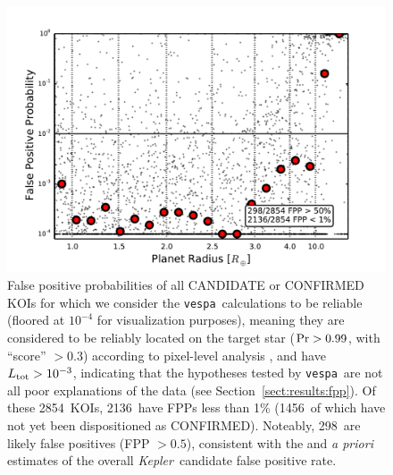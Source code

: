\documentclass{emulateapj}
\newcommand{\figlabel}[1]{\label{fig:#1}}
\newcommand{\sectionname}{Section}
\newcommand{\Sect}[1]{\sectionname~\ref{sect:#1}}
\newcommand{\sect}[1]{\Sect{#1}}
\newcommand{\nreliable}{2854}
\newcommand{\nval}{2136}
\newcommand{\nreliableFP}{298}
\newcommand{\nvalnew}{1456}
\newcommand{\posprobthresh}{0.3}
\newcommand{\kepler}{\textit{Kepler}}
\newcommand{\vespa}{\texttt{vespa}}
\begin{document}
\begin{figure}[p]
\begin{center}
\includegraphics[width=7in]{figures/fpp_summary_all.pdf}
\end{center}
\caption{False positive probabilities of all CANDIDATE or CONFIRMED
  KOIs for which we consider the \vespa\ calculations to be reliable
  (floored at $10^{-4}$ for visualization purposes), meaning they are
  considered to be reliably located on the target star ($ {\rm Pr} >
  0.99$, with ``score'' $> \posprobthresh$) according to pixel-level analysis
  \citep{Bryson:KSCI}, and have $L_{\rm tot} > 10^{-3}$, indicating
  that the hypotheses tested by \vespa\ are not all poor explanations
  of the data (see \sect{results:fpp}).  Of these \nreliable\ KOIs,
  \nval\ have FPPs less than 1\% (\nvalnew\ of which have not yet been
  dispositioned as CONFIRMED).  Noteably, \nreliableFP\ are likely
  false positives (FPP $> 0.5$), consistent with the
  \citet{Morton:2011b} and \citet{Fressin:2013} \emph{a priori}
  estimates of the overall \kepler\ candidate false positive rate.
  \figlabel{fppall}}
\end{figure}
\end{document}
